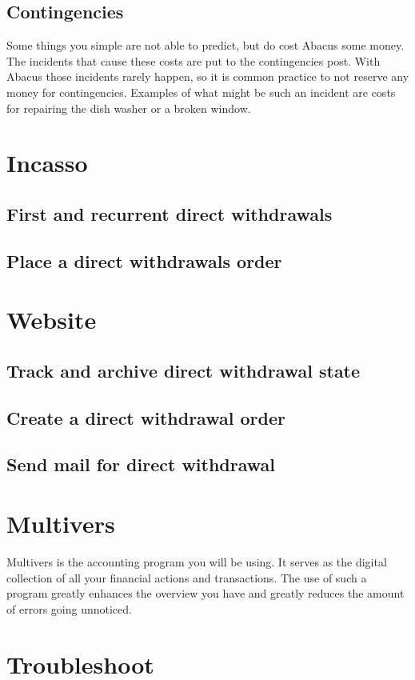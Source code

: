 \documentclass{report}
\begin{document}
\subsection{Contingencies}
Some things you simple are not able to predict, but do cost Abacus some money. The incidents that cause these costs are put to the contingencies post. With Abacus those incidents rarely happen, so it is common practice to not reserve any money for contingencies. Examples of what might be such an incident are costs for repairing the dish washer or a broken window.
\section{Incasso}
\subsection{First and recurrent direct withdrawals}
\subsection{Place a direct withdrawals order}
\section{Website}
\subsection{Track and archive direct withdrawal state}
\subsection{Create a direct withdrawal order}
\subsection{Send mail for direct withdrawal}
\section{Multivers}
Multivers is the accounting program you will be using. It serves as the digital collection of all your financial actions and transactions. The use of such a program greatly enhances the overview you have and greatly reduces the amount of errors going unnoticed.
\section{Troubleshoot}
\end{document}
